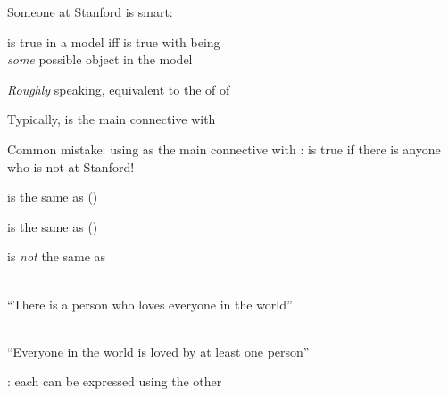 \documentclass{article}
\begin{document}
\begin{huge}


Someone at Stanford is smart:\\

\quad is true in a model  iff  is true with  being\\
\emph{some} possible object in the model

\emph{Roughly} speaking, equivalent to the  of  of 


Typically, \mat{$\land$} is the main connective with \mat{$\exists$}

Common mistake: using \mat{$\implies$} as the main connective with \mat{$\exists$}:
is true if there is anyone who is not at Stanford!




 is the same as  ()

 is the same as  ()

 is \emph{not} the same as 

\\
``There is a person who loves everyone in the world''

\\
``Everyone in the world is loved by at least one person''

: each can be expressed using the other


\end{huge}
\end{document}
